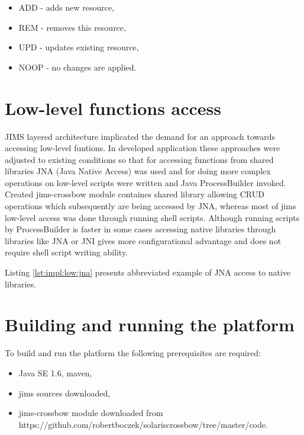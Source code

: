 \documentclass[11pt]{book}
\begin{document}
      \begin{itemize}
        \item ADD - adds new resource,
        \item REM - removes this resource,
        \item UPD - updates existing resource,
        \item NOOP - no changes are applied.
      \end{itemize}

    \section{Low-level functions access}
    \label{sec:impl:low}

      JIMS layered architecture implicated the demand for an approach towards accessing low-level funtions. In developed
      application these approaches were adjusted to existing conditions so that for accessing functions from shared
      libraries JNA (Java Native Access) was used and for doing more complex operations on low-level scripts were
      written and Java ProcessBuilder invoked. Created jims-crossbow module containes shared library allowing CRUD
      operations which subsequently are being accessed by JNA, whereas most of jims low-level access was done through
      running shell scripts. Although running scripts by ProcessBuilder is faster in some cases accessing native
      libraries through libraries like JNA or JNI gives more configurational advantage and does not require shell script
      writing ability.

      Listing \ref{lst:impl:low:jna} presents abbreviated example of JNA access to native libraries. \\

      \noindent
      \begin{minipage}{\textwidth}
        
      \end{minipage}


    \section{Building and running the platform}
    \label{sec:impl:build}

      To build and run the platform the following prerequisites are required:

      \begin{itemize}
        \item Java SE 1.6, maven,
        \item jims sources downloaded,
        \item jims-crossbow module downloaded from \\ https://github.com/robertboczek/solaris\-crossbow/tree/master/code.
      \end{itemize}
\end{document}
